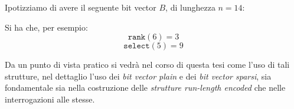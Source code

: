 \begin{esempio}
  Ipotizziamo di avere il seguente bit vector $B$, di lunghezza $n=14$:
  \begin{center}
  \end{center}
  Si ha che, per esempio:
  \[\mathtt{rank}(6)=3\]
  \[\mathtt{select}(5) =9\]
\end{esempio}
Da un punto di vista pratico si vedrà nel corso di questa tesi come l'uso di
tali strutture, nel dettaglio l'uso dei \textit{bit vector plain} e dei
\textit{bit vector sparsi}, sia fondamentale sia nella costruzione delle
\textit{strutture run-length encoded} che nelle interrogazioni alle stesse.



